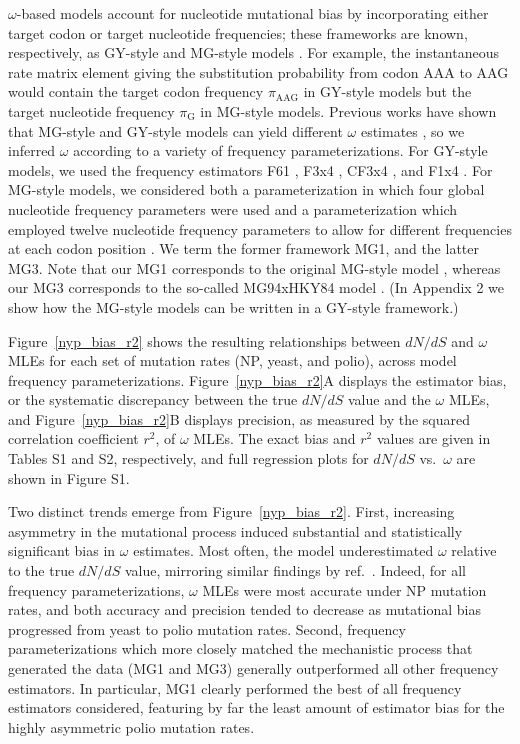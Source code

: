 \documentclass[11pt]{article}
\begin{document}
$\omega$-based models account for nucleotide mutational bias by incorporating either target codon \cite{GoldmanYang1994} or target nucleotide \cite{MuseGaut1994} frequencies; these frameworks are known, respectively, as GY-style and MG-style models \cite{KosakovskyPond2010}. For example, the instantaneous rate matrix element giving the substitution probability from codon AAA to AAG would contain the target codon frequency $\pi_\text{AAG}$ in GY-style models but the target nucleotide frequency $\pi_\text{G}$ in MG-style models. Previous works have shown that MG-style and GY-style models can yield different $\omega$ estimates \cite{KosakovskyPondMuse2005,Yap2010}, so we inferred $\omega$ according to a variety of frequency parameterizations. For GY-style models, we used the frequency estimators F61 \cite{GoldmanYang1994}, F3x4 \cite{GoldmanYang1994}, CF3x4 \cite{KosakovskyPond2010}, and F1x4 \cite{MuseGaut1994}. For MG-style models, we considered both a parameterization in which four global nucleotide frequency parameters were used \cite{MuseGaut1994} and a parameterization which employed twelve nucleotide frequency parameters to allow for different frequencies at each codon position \cite{KosakovskyPondMuse2005}. We term the former framework MG1, and the latter MG3. Note that our MG1 corresponds to the original MG-style model \cite{MuseGaut1994}, whereas our MG3 corresponds to the so-called MG94xHKY84 model \cite{KosakovskyPondMuse2005}. (In Appendix 2 we show how the MG-style models can be written in a GY-style framework.)

Figure~\ref{nyp_bias_r2} shows the resulting relationships between $dN/dS$ and $\omega$ MLEs for each set of mutation rates (NP, yeast, and polio), across model frequency parameterizations. Figure~\ref{nyp_bias_r2}A displays the estimator bias, or the systematic discrepancy between the true $dN/dS$ value and the $\omega$ MLEs, and Figure~\ref{nyp_bias_r2}B displays precision, as measured by the squared correlation coefficient $r^2$, of $\omega$ MLEs. The exact bias and $r^2$ values are given in Tables S1 and S2, respectively, and full regression plots for $dN/dS$ vs.\ $\omega$ are shown in Figure S1.

Two distinct trends emerge from Figure~\ref{nyp_bias_r2}. First, increasing asymmetry in the mutational process induced substantial and statistically significant bias in $\omega$ estimates. Most often, the model underestimated $\omega$ relative to the true $dN/dS$ value, mirroring similar findings by ref.\ \cite{Yap2010}. Indeed, for all frequency parameterizations, $\omega$ MLEs were most accurate under NP mutation rates, and both accuracy and precision tended to decrease as mutational bias progressed from yeast to polio mutation rates. Second, frequency parameterizations which more closely matched the mechanistic process that generated the data (MG1 and MG3) generally outperformed all other frequency estimators. In particular, MG1 clearly performed the best of all frequency estimators considered, featuring by far the least amount of estimator bias for the highly asymmetric polio mutation rates.
\end{document}
